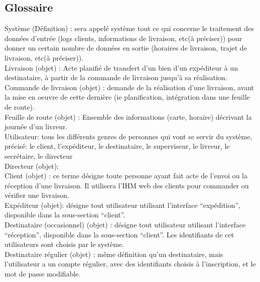\documentclass{report}
\begin{document}
\begin{appendices}


\chapter{Glossaire}


Système (Définition) : sera appelé système tout ce qui concerne le traitement des données d’entrée (logs clients, informations de livraison, etc(à préciser)) pour donner un certain nombre de données en sortie (horaires de livraison, trajet de livraison, etc(à préciser)).\\

Livraison (objet) : Acte planifié de transfert d’un bien d’un expéditeur à un destinataire, à partir de la commande de livraison  jusqu’à sa réalisation.\\

Commande de livraison (objet) : demande de la réalisation d’une livraison, avant la mise en oeuvre de cette dernière (ie planification, intégration dans une feuille de route).\\

Feuille de route (objet) : Ensemble des informations (carte, horaire) décrivant la journée d’un livreur. \\

Utilisateur: tous les différents genres de personnes qui vont se servir du système, précisé: le client, l’expéditeur, le destinataire, le superviseur, le livreur, le secrétaire, le directeur\\

Directeur (objet):\\

Client (objet) :  ce terme désigne toute personne ayant fait acte de l’envoi ou la réception d’une livraison. Il utilisera l’IHM web des clients pour commander ou vérifier une livraison. \\

Expéditeur (objet): désigne tout utilisateur utilisant l’interface “expédition”, disponible dans la sous-section “client”.\\

Destinataire (occasionnel) (objet) : désigne tout utilisateur utilisant l’interface “réception”, disponible dans la sous-section “client”. Les identifiants de cet utilisateurs sont choisis par le système.\\

Destinataire régulier (objet) : même définition qu’un destinataire, mais l’utilisateur a un compte régulier, avec des identifiants choisis à l’inscription, et le mot de passe modifiable.\\


\end{appendices}
\end{document}
